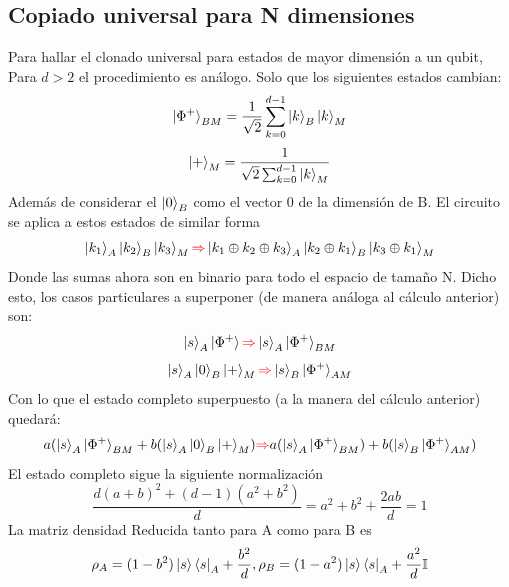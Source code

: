 \documentclass{book}
\begin{document}
\subsection{Copiado universal para N dimensiones}
Para hallar el clonado universal para estados de mayor dimensión a un qubit, Para $d>2$ el procedimiento es análogo. Solo que los siguientes estados cambian:
\begin{equation}  \label{eq2.57}{ \ket{\Phi^+}_{BM}=\frac{1}{\sqrt{2}}\sum_{k=0}^{d-1}  \ket{k}_B \ket{k}_M }\end{equation}
\begin{equation} \label{eq2.58}{\ket{+}_{M}=\frac{1}{\sqrt{2}\sum_{k=0}^{d-1} \ket{k}_M }}\end{equation}
Además de considerar el $\ket{0}_B$ como el vector 0 de la dimensión de B. El circuito se aplica a estos estados de similar forma
\begin{equation} \label{eq2.59}      
{\ket{k_1}_A\ket{k_2}_B\ket{k_3}_M\textcolor{red}{\Rightarrow} \ket{k_1\oplus k_2 \oplus k_3}_A\ket{k_2 \oplus k_1}_B\ket{k_3 \oplus k_1}_M
}\end{equation}
Donde las sumas ahora son en binario para todo el espacio de tamaño N. Dicho esto, los casos particulares a superponer (de manera análoga al cálculo anterior) son:
\begin{equation} \label{eq2.60}{     \ket{s}_A\ket{\Phi^+} \textcolor{red}{\Rightarrow} \ket{s}_A
\ket{\Phi^+}_{BM} 
}\end{equation}
\begin{equation} \label{eq2.61} {     
\ket{s}_A\ket{0}_B\ket{+}_M\textcolor{red}{\Rightarrow} \ket{s}_B\ket{\Phi^+}_{AM}
}\end{equation}
Con lo que el estado completo superpuesto (a la manera del cálculo anterior) quedará:
\begin{equation} \label{eq2.62}      
\begin{aligned}{ a(\ket{s}_A\ket{\Phi^+}_{BM}+b(\ket{s}_A\ket{0}_B\ket{+}_M)\textcolor{red}{\Rightarrow}}  {a(\ket{s}_A\ket{\Phi^+}_{BM})+b( \ket{s}_B\ket{\Phi^+}_{AM})}
\end{aligned}\end{equation}
El estado completo sigue la siguiente normalización
\begin{equation} \label{eq2.63} {\frac{d(a+b)^2+(d-1)(a^2+b^2)} {d} = a^2+b^2+\frac{2ab}{d}=1 }\end{equation} 
La matriz densidad Reducida tanto para A como para B es
\begin{equation} \label{eq2.64} {
\rho_A=(1-b^2)\ket{s}\bra{s}_A + \frac{b^2}{d},
\rho_B=(1-a^2)\ket{s}\bra{s}_A + \frac{a^2}{d}
 \mathbb{I} }\end{equation}
\end{document}
